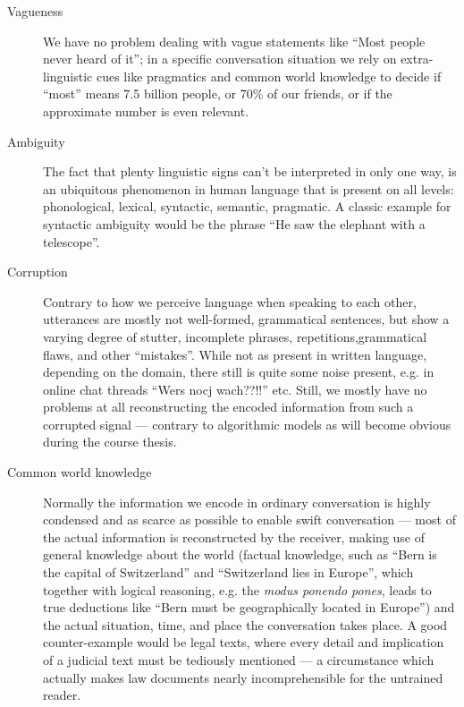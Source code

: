 \begin{description}
  \item[Vagueness] We have no problem dealing with vague statements like ``Most people never heard of it''; in a
    specific conversation situation we rely on extra-linguistic cues like pragmatics and common
    world knowledge to decide if ``most'' means 7.5 billion people, or 70\% of our friends, or if
    the approximate number is even relevant.
  \item[Ambiguity] The fact that plenty linguistic signs can't be interpreted in only one way, is an ubiquitous
    phenomenon in human language that is present on all levels: phonological, lexical, syntactic,
    semantic, pragmatic. A classic example for syntactic ambiguity would be the phrase ``He saw
    the elephant with a telescope''.
  \item[Corruption] Contrary to how we perceive language when speaking to each other, utterances are mostly
    not well-formed, grammatical sentences, but show a varying degree of stutter, incomplete
    phrases, repetitions,grammatical flaws, and other ``mistakes''. While not as present in
    written language, depending on the domain, there still is quite some noise present, e.g.
    in online chat threads ``Wers nocj wach??!!'' etc. Still, we mostly have no problems at
    all reconstructing the encoded information from such a corrupted signal --- contrary to
    algorithmic models as will become obvious during the course thesis.
  \item[Common world knowledge] Normally the information we encode in ordinary conversation is highly condensed and as scarce
    as possible to enable swift conversation --- most of the actual information is reconstructed by the receiver, making use
    of general knowledge about the world (factual knowledge, such as ``Bern is the capital of
    Switzerland'' and ``Switzerland lies in Europe'', which together with logical reasoning, e.g.
    the \textit{modus ponendo pones}, leads to true deductions like ``Bern must be geographically
    located in Europe'') and the actual situation, time, and place the conversation takes place.
    A good counter-example would be legal texts, where every detail and implication of a judicial text
    must be tediously mentioned --- a circumstance which actually makes law documents nearly incomprehensible for the
    untrained reader.

\end{description}

